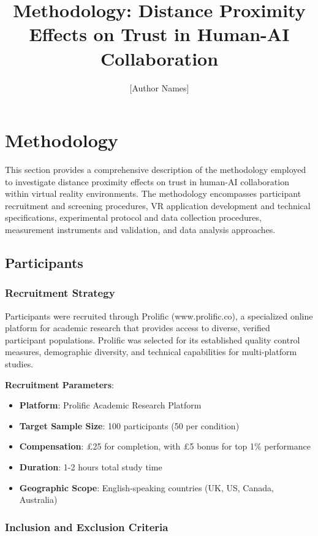 \documentclass[12pt]{article}
\title{\textbf{Methodology: Distance Proximity Effects on Trust in Human-AI Collaboration}}
\author{[Author Names]}
\date{}
\begin{document}
\maketitle

\section{Methodology}

This section provides a comprehensive description of the methodology employed to investigate distance proximity effects on trust in human-AI collaboration within virtual reality environments. The methodology encompasses participant recruitment and screening procedures, VR application development and technical specifications, experimental protocol and data collection procedures, measurement instruments and validation, and data analysis approaches.

\subsection{Participants}

\subsubsection{Recruitment Strategy}

Participants were recruited through Prolific (www.prolific.co), a specialized online platform for academic research that provides access to diverse, verified participant populations. Prolific was selected for its established quality control measures, demographic diversity, and technical capabilities for multi-platform studies.

\textbf{Recruitment Parameters}:
\begin{itemize}
    \item \textbf{Platform}: Prolific Academic Research Platform
    \item \textbf{Target Sample Size}: 100 participants (50 per condition)
    \item \textbf{Compensation}: £25 for completion, with £5 bonus for top 1\% performance
    \item \textbf{Duration}: 1-2 hours total study time
    \item \textbf{Geographic Scope}: English-speaking countries (UK, US, Canada, Australia)
\end{itemize}

\subsubsection{Inclusion and Exclusion Criteria}
\end{document}
